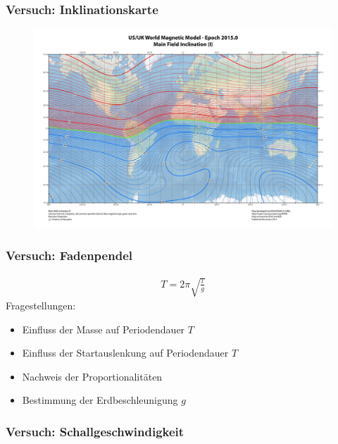 \documentclass{beamer}
\begin{document}
\begin{frame}
    \frametitle{Versuch: Inklinationskarte}
    \begin{figure}[htpb]
        \centering
        \includegraphics[width=1\textwidth]{inklination2}
    \end{figure}

\end{frame}

\begin{frame}
    \frametitle{Versuch: Fadenpendel}
    \begin{align*}
        T = 2 \pi \sqrt{\frac{l}{g}}
    \end{align*}
    Fragestellungen:
    \begin{itemize}
        \item Einfluss der Masse auf Periodendauer $T$
        \item Einfluss der Startauslenkung auf Periodendauer $T$
        \item Nachweis der Proportionalitäten
        \item Bestimmung der Erdbeschleunigung $g$
    \end{itemize}
\end{frame}

\begin{frame}
    \frametitle{Versuch: Schallgeschwindigkeit}
\end{frame}
\end{document}
